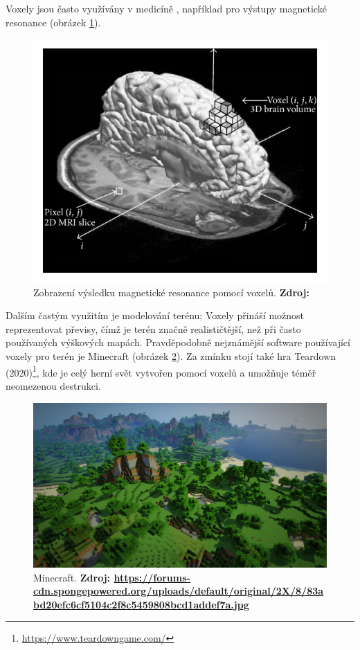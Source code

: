 Voxely jsou často využívány v medicíně \cite{medical_vox}, například pro výstupy magnetické resonance (obrázek \ref{fig:mri_vox}).

\begin{figure}[H]
    \centering
    \includegraphics[scale=1]{obrazky-figures/voxel_mri.png}
    \caption{Zobrazení výsledku magnetické resonance pomocí voxelů. \textbf{Zdroj: \cite{mri}}}
    \label{fig:mri_vox}
\end{figure}

Dalším častým využitím je modelování terénu; Voxely přináší možnost reprezentovat převisy, čímž je terén značně realističtější, než při často používaných výškových mapách. Pravděpodobně nejznámější software používající voxely pro terén je Minecraft (obrázek \ref{fig:minecraft}). Za zmínku stojí také hra Teardown (2020)\footnote{\url{https://www.teardowngame.com/}}, kde je celý herní svět vytvořen pomocí voxelů a umožňuje téměř neomezenou destrukci.

\begin{figure}[H]
    \centering
    \includegraphics[scale=0.2]{obrazky-figures/minecraft.jpg}
    \caption{Minecraft. \textbf{Zdroj: \url{https://forums-cdn.spongepowered.org/uploads/default/original/2X/8/83abd20efc6cf5104c2f8c5459808bcd1addef7a.jpg}}}
    \label{fig:minecraft}
\end{figure}

